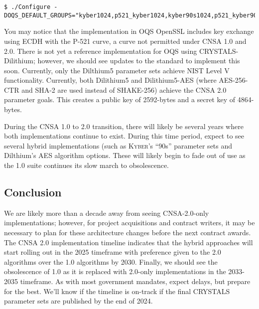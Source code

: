 \begin{lstlisting}[caption={Configuring OpenSSL TLS 1.3 for using CRYSTALS-Kyber},captionpos=b,style=BashStyle,label={lst:20220919:kyber}]
$ ./Configure -DOQS_DEFAULT_GROUPS="kyber1024,p521_kyber1024,kyber90s1024,p521_kyber90s1024"
\end{lstlisting}

You may notice that the implementation in OQS OpenSSL includes key exchange using ECDH with the P-521 curve, a curve not permitted under CNSA 1.0 and 2.0. There is not yet a reference implementation for OQS using CRYSTALS-Dilithium; however, we should see updates to the standard to implement this soon. Currently, only the Dilthium5 parameter sets achieve NIST Level V functionality. Currently, both Dilithium5 and Dilithium5-AES (where AES-256-CTR and SHA-2 are used instead of SHAKE-256) achieve the CNSA 2.0 parameter goals. This creates a public key of 2592-bytes and a secret key of 4864-bytes.

During the CNSA 1.0 to 2.0 transition, there will likely be several years where both implementations continue to exist. During this time period, expect to see several hybrid implementations (such as K\textsc{yber}'s ``90s'' parameter sets and Dilthium's AES algorithm options. These will likely begin to fade out of use as the 1.0 suite continues its slow march to obsolescence.

\subsection{Conclusion}
We are likely more than a decade away from seeing CNSA-2.0-only implementations; however, for project acquisitions and contract writers, it may be necessary to plan for these architecture changes before the next contract awards. The CNSA 2.0 implementation timeline indicates that the hybrid approaches will start rolling out in the 2025 timeframe with preference given to the 2.0 algorithms over the 1.0 algorithms by 2030. Finally, we should see the obsolescence of 1.0 as it is replaced with 2.0-only implementations in the 2033-2035 timeframe. As with most government mandates, expect delays, but prepare for the best. We'll know if the timeline is on-track if the final CRYSTALS parameter sets are published by the end of 2024.
